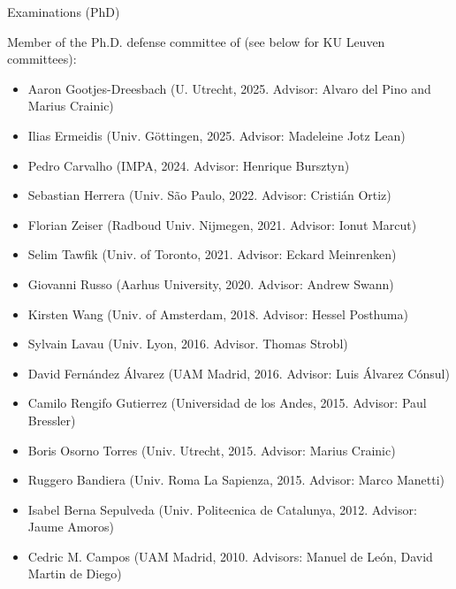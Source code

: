 \documentclass[12p]{resume}
\begin{document}
\begin{category}{Examinations (PhD)}

\citemnobullet 
 Member of the Ph.D. defense committee  of (see below for KU Leuven committees):
 \begin{itemize}
 \item Aaron Gootjes-Dreesbach (U. Utrecht, 2025. Advisor: Alvaro del Pino and Marius Crainic)
\item Ilias Ermeidis (Univ. G\"ottingen, 2025. Advisor: Madeleine Jotz Lean)
  \item Pedro Carvalho (IMPA, 2024. Advisor: Henrique Bursztyn)
 \item Sebastian Herrera (Univ. S\~{a}o Paulo, 2022. Advisor: Cristi\'an Ortiz)
\item Florian Zeiser (Radboud Univ. Nijmegen, 2021. Advisor: Ionut Marcut)
\item Selim Tawfik (Univ. of Toronto, 2021. Advisor: Eckard Meinrenken)
\item Giovanni Russo (Aarhus University, 2020. Advisor: Andrew Swann)
\item Kirsten Wang (Univ. of Amsterdam, 2018. Advisor: Hessel Posthuma)
\item Sylvain Lavau (Univ. Lyon, 2016. Advisor. Thomas Strobl)
\item David Fern\'andez \'Alvarez (UAM Madrid, 2016. Advisor:  Luis \'Alvarez C\'onsul)
\item Camilo Rengifo Gutierrez (Universidad de los Andes, 2015. Advisor:  Paul Bressler)
\item Boris Osorno Torres (Univ. Utrecht, 2015. Advisor: Marius Crainic)
\item Ruggero Bandiera (Univ. Roma La Sapienza, 2015. Advisor: Marco Manetti)
\item Isabel Berna Sepulveda (Univ. Politecnica de Catalunya, 2012. Advisor: Jaume Amoros)
\item  Cedric M. Campos (UAM Madrid, 2010. Advisors: Manuel de Le\'on,  David Martin de Diego)
\end{itemize}


\end{category}
\end{document}
